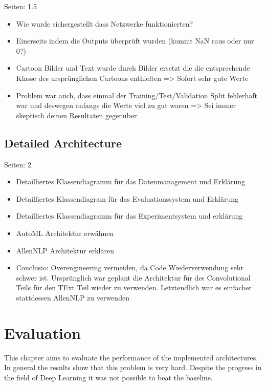 \documentclass[draft,final,oneside]{vutinfth} %
\begin{document}
Seiten: 1.5

\begin{itemize}
\item Wie wurde sichergestellt dass Netzwerke funktionierten? 
\item Einerseits indem die Outputs überprüft wurden (kommt NaN raus oder nur 0?)
\item Cartoon Bilder und Text wurde durch Bilder ersetzt die die entsprechende Klasse des ursprünglichen Cartoons enthielten => Sofort sehr gute Werte
\item Problem war auch, dass einmal der Training/Test/Validation Split fehlerhaft war und deswegen anfangs die Werte viel zu gut waren => Sei immer skeptisch deinen Resultaten gegenüber.
\end{itemize}


\section{Detailed Architecture}

Seiten: 2

\begin{itemize}

\item Detailliertes Klassendiagramm für das Datenmanagement und Erklärung
\item Detailliertes Klassendiagram für das Evaluationssystem und Erklärung
\item Detailliertes Klassendiagramm für das Experimentsystem und erklärung 
\item AutoML Architektur erwähnen
\item AllenNLP Architektur erklären
\item Conclusio: Overengineering vermeiden, da Code Wiederverwendung sehr schwer ist. Ursprünglich war geplant die Architektur für des Convolutional Teils für den TExt Teil wieder zu verwenden. Letztendlich war es einfacher stattdessen AllenNLP zu verwenden

\end{itemize}


\chapter{Evaluation}

This chapter aims to evaluate the performance of the implemented architectures. In
general the results show that this problem is very hard. Despite the progress in the field of Deep Learning it was not possible to beat the baseline. \\
\end{document}
